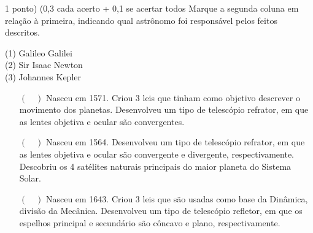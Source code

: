 \documentclass{../lista}
\begin{document}
	\begin{questao}{1 ponto) (0,3 cada acerto + 0,1 se acertar todos}
		Marque a segunda coluna em relação à primeira, indicando qual astrônomo foi responsável pelos feitos descritos.
		\begin{multicols}{2}
			\vfill\null \vfill\null
			\begin{flushleft}
				(1) Galileo Galilei \\
				(2) Sir Isaac Newton \\
				(3) Johannes Kepler
			\end{flushleft}
			\vfill\null \vfill\null
			\columnbreak
			\begin{itemize}
				\item[$(\quad)$] Nasceu em 1571. Criou 3 leis que tinham como objetivo descrever o movimento dos planetas. Desenvolveu um tipo de telescópio refrator, em que as lentes objetiva e ocular são convergentes.
				\item[$(\quad)$] Nasceu em 1564. Desenvolveu um tipo de telescópio refrator, em que as lentes objetiva e ocular são convergente e divergente, respectivamente. Descobriu os 4 satélites naturais principais do maior planeta do Sistema Solar.
				\item[$(\quad)$] Nasceu em 1643. Criou 3 leis que são usadas como base da Dinâmica, divisão da Mecânica. Desenvolveu um tipo de telescópio refletor, em que os espelhos principal e secundário são côncavo e plano, respectivamente.
			\end{itemize}
		\end{multicols}
	\end{questao}
\end{document}
